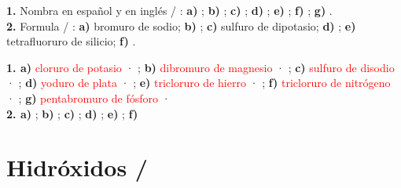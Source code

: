 \begin{exercise}
    \textbf{1.} Nombra en español y en inglés / : \textbf{a)} ; \textbf{b)} ; \textbf{c)} ; \textbf{d)} ; \textbf{e)} ; \textbf{f)} ; \textbf{g)} .\\
    \textbf{2.} Formula / : \textbf{a)} bromuro de sodio; \textbf{b)} ; \textbf{c)} sulfuro de dipotasio; \textbf{d)} ; \textbf{e)} tetrafluoruro de silicio; \textbf{f)} .
    \begin{solu}
        \textbf{1. a)} \textcolor{red}{cloruro de potasio} · \textcolor{red}{}; \textbf{b)} \textcolor{red}{dibromuro de magnesio} · \textcolor{red}{}; \textbf{c)} \textcolor{red}{sulfuro de disodio} · \textcolor{red}{}; \textbf{d)} \textcolor{red}{yoduro de plata} · \textcolor{red}{}; \textbf{e)} \textcolor{red}{tricloruro de hierro} · \textcolor{red}{}; \textbf{f)} \textcolor{red}{tricloruro de nitrógeno} · \textcolor{red}{}; \textbf{g)} \textcolor{red}{pentabromuro de fósforo} · \textcolor{red}{}\\
        \textbf{2. a)} \textcolor{red}{}; \textbf{b)} \textcolor{red}{}; \textbf{c)} \textcolor{red}{}; \textbf{d)} \textcolor{red}{}; \textbf{e)} \textcolor{red}{}; \textbf{f)} \textcolor{red}{}
    \end{solu}
\end{exercise}

\section{Hidróxidos / }

